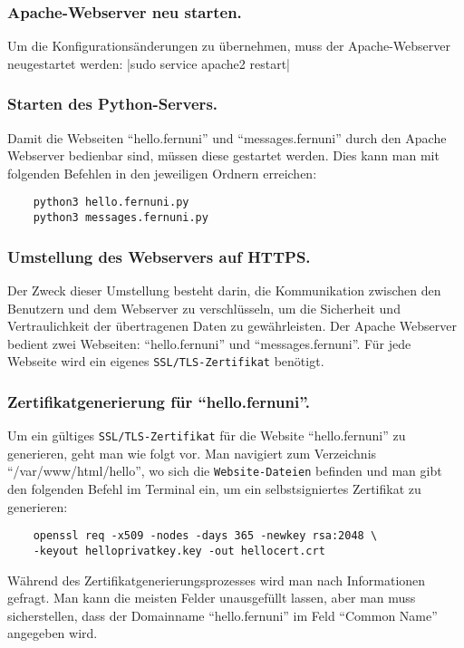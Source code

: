 \subsubsection*{Apache-Webserver neu starten.}
Um die Konfigurationsänderungen zu übernehmen, muss der Apache-Webserver neugestartet werden:
|sudo service apache2 restart|

\subsubsection*{Starten des Python-Servers.}

Damit die Webseiten \enquote{hello.fernuni} und \enquote{messages.fernuni} durch den Apache Webserver bedienbar sind, müssen diese gestartet werden. Dies kann man mit folgenden Befehlen in den jeweiligen Ordnern erreichen:

\begin{verbatim}
    python3 hello.fernuni.py
    python3 messages.fernuni.py
\end{verbatim}

\subsubsection*{Umstellung des Webservers auf HTTPS.}
Der Zweck dieser Umstellung besteht darin, die Kommunikation zwischen den Benutzern und dem Webserver zu verschlüsseln, um die Sicherheit und Vertraulichkeit der übertragenen Daten zu gewährleisten. Der Apache Webserver bedient zwei Webseiten: \enquote{hello.fernuni} und \enquote{messages.fernuni}. Für jede Webseite wird ein eigenes \verb+SSL/TLS-Zertifikat+ benötigt.

\subsubsection*{Zertifikatgenerierung für \enquote{hello.fernuni}.}
Um ein gültiges \verb+SSL/TLS-Zertifikat+ für die Website \enquote{hello.fernuni} zu generieren, geht man wie folgt vor.
Man navigiert zum Verzeichnis \enquote{/var/www/html/hello}, wo sich die \verb+Website-Dateien+ befinden und man gibt den folgenden Befehl im Terminal ein, um ein selbstsigniertes Zertifikat zu generieren:

\begin{verbatim}
    openssl req -x509 -nodes -days 365 -newkey rsa:2048 \
    -keyout helloprivatkey.key -out hellocert.crt
\end{verbatim}

Während des Zertifikatgenerierungsprozesses wird man nach Informationen gefragt. Man kann die meisten Felder unausgefüllt lassen, aber man muss sicherstellen, dass der Domainname \enquote{hello.fernuni} im Feld \enquote{Common Name} angegeben wird.


